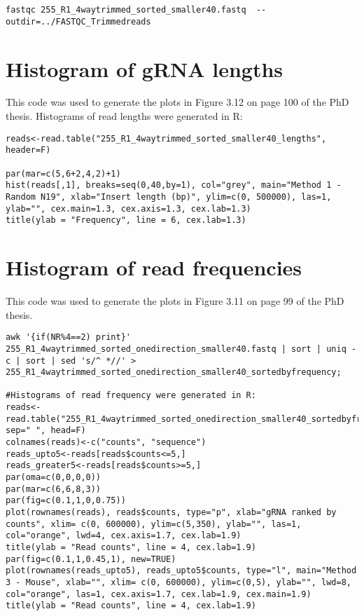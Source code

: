 \begin{small}\begin{lstlisting}
fastqc 255_R1_4waytrimmed_sorted_smaller40.fastq  --outdir=../FASTQC_Trimmedreads
\end{lstlisting}\end{small}


\section{Histogram of gRNA lengths}

This code was used to generate the plots in Figure 3.12 on page 100 of the PhD thesis.
Histograms of read lengths were generated in R:

\begin{small}\begin{lstlisting}
reads<-read.table("255_R1_4waytrimmed_sorted_smaller40_lengths", header=F)

par(mar=c(5,6+2,4,2)+1)
hist(reads[,1], breaks=seq(0,40,by=1), col="grey", main="Method 1 - Random N19", xlab="Insert length (bp)", ylim=c(0, 500000), las=1, ylab="", cex.main=1.3, cex.axis=1.3, cex.lab=1.3)
title(ylab = "Frequency", line = 6, cex.lab=1.3)
\end{lstlisting}\end{small} 
 
 \section{Histogram of read frequencies}
 
 This code was used to generate the plots in Figure 3.11 on page 99 of the PhD thesis.

\begin{small}\begin{lstlisting}
awk '{if(NR%4==2) print}' 255_R1_4waytrimmed_sorted_onedirection_smaller40.fastq | sort | uniq -c | sort | sed 's/^ *//' > 255_R1_4waytrimmed_sorted_onedirection_smaller40_sortedbyfrequency;

#Histograms of read frequency were generated in R:
reads<-read.table("255_R1_4waytrimmed_sorted_onedirection_smaller40_sortedbyfrequency", sep=" ", head=F)
colnames(reads)<-c("counts", "sequence")
reads_upto5<-reads[reads$counts<=5,]
reads_greater5<-reads[reads$counts>=5,]
par(oma=c(0,0,0,0))
par(mar=c(6,6,8,3))
par(fig=c(0.1,1,0,0.75))
plot(rownames(reads), reads$counts, type="p", xlab="gRNA ranked by counts", xlim= c(0, 600000), ylim=c(5,350), ylab="", las=1, col="orange", lwd=4, cex.axis=1.7, cex.lab=1.9)
title(ylab = "Read counts", line = 4, cex.lab=1.9)
par(fig=c(0.1,1,0.45,1), new=TRUE)
plot(rownames(reads_upto5), reads_upto5$counts, type="l", main="Method 3 - Mouse", xlab="", xlim= c(0, 600000), ylim=c(0,5), ylab="", lwd=8, col="orange", las=1, cex.axis=1.7, cex.lab=1.9, cex.main=1.9)
title(ylab = "Read counts", line = 4, cex.lab=1.9)
\end{lstlisting}\end{small}

